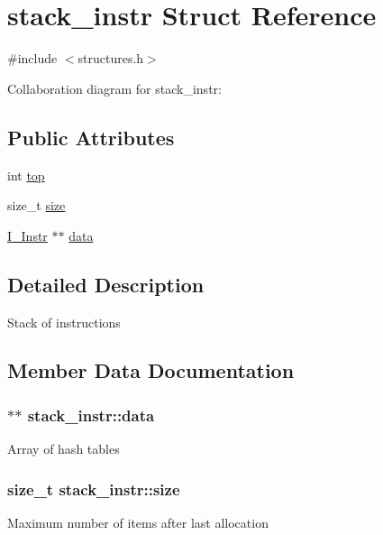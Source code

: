 \hypertarget{structstack__instr}{}\section{stack\+\_\+instr Struct Reference}
\label{structstack__instr}


{\ttfamily \#include $<$structures.\+h$>$}



Collaboration diagram for stack\+\_\+instr\+:
\subsection*{Public Attributes}
\begin{DoxyCompactItemize}
\item 
int \hyperlink{structstack__instr_a1b85b397a6e1175d2ec961ce410ac9fa}{top}
\item 
size\+\_\+t \hyperlink{structstack__instr_a6ff7d4a9bec03ea7309c4503cd848aeb}{size}
\item 
\hyperlink{structI__Instr}{I\+\_\+\+Instr} $\ast$$\ast$ \hyperlink{structstack__instr_a7de5019066f3917d377603cdb284ac13}{data}
\end{DoxyCompactItemize}


\subsection{Detailed Description}
Stack of instructions 

\subsection{Member Data Documentation}
\subsubsection[{\texorpdfstring{data}{data}}]{$\ast$$\ast$ stack\+\_\+instr\+::data}\hypertarget{structstack__instr_a7de5019066f3917d377603cdb284ac13}{}\label{structstack__instr_a7de5019066f3917d377603cdb284ac13}
Array of hash tables 
\subsubsection[{\texorpdfstring{size}{size}}]{\setlength{\rightskip}{0pt plus 5cm}size\+\_\+t stack\+\_\+instr\+::size}\hypertarget{structstack__instr_a6ff7d4a9bec03ea7309c4503cd848aeb}{}\label{structstack__instr_a6ff7d4a9bec03ea7309c4503cd848aeb}
Maximum number of items after last allocation 
